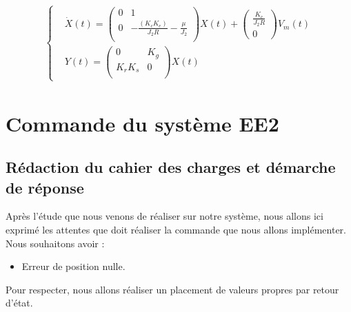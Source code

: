 \begin{align}
\label{EE2}
\left\lbrace
\begin{aligned}
&\dot{X}(t) 
=
 \begin{pmatrix}
0 &	1 \\
0	&	-\frac{(K_cK_e)}{J_2R}-\frac{\mu}{J_2}\\
\end{pmatrix}X(t)
+
\begin{pmatrix}
\frac{K_c}{J_2R}\\
0
\end{pmatrix} 
V_m(t)\\
&Y(t) = \begin{pmatrix}
0	&	K_g	\\
K_rK_s	&	0	\\
\end{pmatrix}X(t)
\end{aligned}
\right.
\end{align}

\section{Commande du système EE2}
\subsection{Rédaction du cahier des charges et démarche de réponse}
Après l'étude que nous venons de réaliser sur notre système, nous allons ici exprimé les attentes que doit réaliser la commande que nous allons implémenter. Nous souhaitons avoir : \begin{itemize} 
\item Erreur de position nulle.
\end{itemize}
Pour respecter, nous allons réaliser un placement de valeurs propres par retour d'état.
